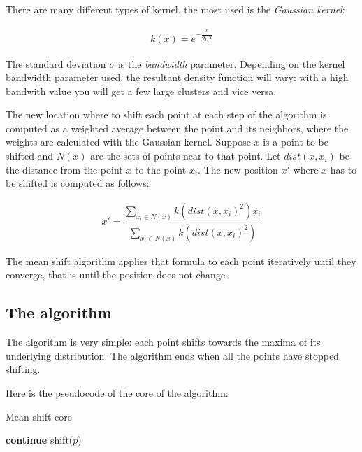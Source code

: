 \documentclass[10pt,twocolumn,letterpaper]{article}
\begin{document}
There are many different types of kernel, the most used is the \textit{Gaussian kernel}:

\begin{align}
k(x) =  e^{-\dfrac{x}{2\sigma^2}}
\end{align}

The standard deviation $\sigma$ is the \textit{bandwidth} parameter. Depending on the kernel bandwidth parameter used, the resultant density function will vary: with a high bandwith value you will get a few large clusters and vice versa.

The new location where to shift each point at each step of the algorithm is computed as a weighted average between the point and its neighbors, where the weights are calculated with the Gaussian kernel. Suppose $x$ is a point to be shifted and $N(x)$ are the sets of points near to that point. Let $dist(x, x_i)$ be the distance from the point $x$ to the point $x_i$. The new position $x'$ where $x$ has to be shifted is computed as follows:

\begin{align}
x' = \dfrac{\sum_{x_i \in N(x)} k(dist(x,x_i)^2) x_i}{\sum_{x_i \in N(x)} k(dist(x, x_i)^2)}
\end{align}

The mean shift algorithm applies that formula to each point iteratively until they converge, that is until the position does not change.

\subsection{The algorithm}

The algorithm is very simple: each point shifts towards the maxima of its underlying distribution. The algorithm ends when all the points have stopped shifting.

Here is the pseudocode of the core of the algorithm:

\begin{algorithm}
\label{MeanShiftAlgSeq}
\caption{Mean shift core}
\begin{algorithmic}

    				\State \textbf{continue}
    			\EndIf
    		\State shift($p$)
    		\EndFor
    \EndWhile

\end{algorithmic}
\end{algorithm}
\end{document}
